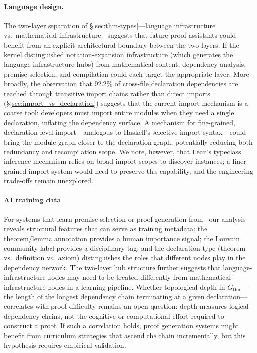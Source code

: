 \paragraph{Language design.} The two-layer separation of \S\ref{sec:thm-types}---language infrastructure vs.\ mathematical infrastructure---suggests that future proof assistants could benefit from an explicit architectural boundary between the two layers. If the kernel distinguished notation-expansion infrastructure (which generates the language-infrastructure hubs) from mathematical content, dependency analysis, premise selection, and compilation could each target the appropriate layer. More broadly, the observation that $92.2\%$ of cross-file declaration dependencies are reached through transitive import chains rather than direct imports (\S\ref{sec:import_vs_declaration}) suggests that the current import mechanism is a coarse tool: developers must import entire modules when they need a single declaration, inflating the dependency surface. A mechanism for fine-grained, declaration-level import---analogous to Haskell's selective import syntax---could bring the module graph closer to the declaration graph, potentially reducing both redundancy and recompilation scope. We note, however, that Lean's typeclass inference mechanism relies on broad import scopes to discover instances; a finer-grained import system would need to preserve this capability, and the engineering trade-offs remain unexplored.

\paragraph{AI training data.} For systems that learn premise selection or proof generation from , our analysis reveals structural features that can serve as training metadata: the theorem/lemma annotation provides a human importance signal; the Louvain community label provides a disciplinary tag; and the declaration type (theorem vs.\ definition vs.\ axiom) distinguishes the roles that different nodes play in the dependency network. The two-layer hub structure further suggests that language-infrastructure nodes may need to be treated differently from mathematical-infrastructure nodes in a learning pipeline. Whether topological depth in $G_{\mathrm{thm}}$---the length of the longest dependency chain terminating at a given declaration---correlates with proof difficulty remains an open question: depth measures logical dependency chains, not the cognitive or computational effort required to construct a proof. If such a correlation holds, proof generation systems might benefit from curriculum strategies that ascend the chain incrementally, but this hypothesis requires empirical validation.

